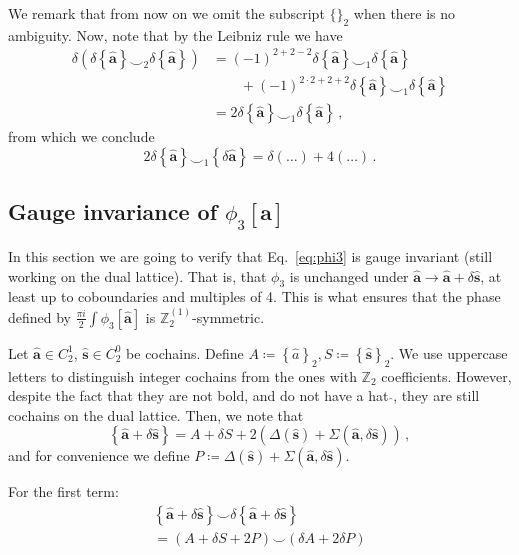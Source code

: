 \documentclass[aps,twocolumn,prx,floatfix,preprintnumbers, nofootinbib,10pt]{revtex4-2}
\numberwithin{equation}{section}
\theoremstyle{definition}
\theoremstyle{remark}
\theoremstyle{claim}
\newcommand{\be}{\begin{equation}}
\newcommand{\ee}{\end{equation}}
\newcommand{\lb}{\left(}
\newcommand{\rb}{\right)}
\newcommand{\lbbb}{\left\{}
\newcommand{\rbbb}{\right\}}
\newcommand{\Z}{{\mathbb Z}}
\newcommand{\lrb}[1]{\lbbb #1 \rbbb}
\begin{document}
We remark that from now on we omit the subscript $\{\}_2$ when there is no ambiguity. Now, note that by the Leibniz rule we have
\begin{align}
 \delta (\delta \lrb{\bm{\hat{a}}} \smile_2 \delta \lrb{\bm{\hat{a}}}) &= (-1)^{2 + 2 - 2} \delta \lrb{\bm{\hat{a}}} \smile_1 \delta \lrb{\bm{\hat{a}}} \nonumber \\
 &\hspace{2em} + (-1)^{2 \cdot 2 + 2 + 2} \delta \lrb{\bm{\hat{a}}} \smile_1 \delta \lrb{\bm{\hat{a}}} \nonumber\\
 &= 2 \delta \lrb{\bm{\hat{a}}} \smile_1 \delta \lrb{\bm{\hat{a}}} \,,
\end{align}
from which we conclude
\be
2 \delta \lrb{\bm{\hat{a}}} \smile_1 \lrb{\delta \bm{\hat{a}}} = \delta (\dots) + 4(\dots) \,.
\ee

\subsection{Gauge invariance of \texorpdfstring{$\phi_3[\bm{\hat{a}}]$}{$\phi_3[\hat{a}]$}}


In this section we are going to verify that Eq.~\eqref{eq:phi3} is gauge invariant (still working on the dual lattice). That is, that $\phi_3$ is unchanged under $\bm{\hat{a}} \to \bm{\hat{a}} + \delta \bm{\hat{s}}$, at least up to coboundaries and multiples of 4. This is what ensures that the phase defined by $\frac{\pi i}{2} \int \phi_3[\bm{\hat{a}}]$ is $\Z_2^{(1)}$-symmetric.

Let $\bm{\hat{a}} \in C^1_2$, $\bm{\hat{s}} \in C^0_2$ be cochains. Define $A \coloneqq \lbbb \hat{a} \rbbb_2, S \coloneqq \lbbb \bm{\hat{s}} \rbbb_2$. We use uppercase letters to distinguish integer cochains from the ones with $\Z_2$ coefficients. However, despite the fact that they are not bold, and do not have a hat $\hat{}$, they are still cochains on the dual lattice. Then, we note that
\be
\lrb{\bm{\hat{a}} + \delta \bm{\hat{s}}} = A + \delta S + 2 (\Delta(\bm{\hat{s}}) + \Sigma(\bm{\hat{a}}, \delta \bm{\hat{s}})) \,,
\ee
and for convenience we define $P \coloneqq \Delta(\bm{\hat{s}}) + \Sigma(\bm{\hat{a}}, \delta \bm{\hat{s}})$.

For the first term:
\begin{multline}
 \lbbb \bm{\hat{a}} + \delta \bm{\hat{s}} \rbbb \smile \delta \lbbb \bm{\hat{a}} + \delta \bm{\hat{s}} \rbbb \\
 = \lb A + \delta S + 2 P \rb \smile \lb \delta A + 2 \delta P \rb
\end{multline}
\end{document}

